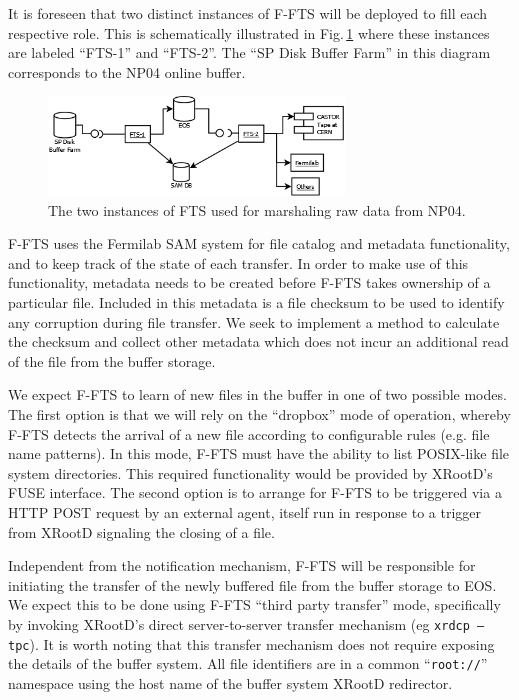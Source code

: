 \documentclass[pdftex,12pt,letter]{article}
\newcommand{\xrd}{XRootD\xspace}
\begin{document}
\noindent It is foreseen that two distinct instances of F-FTS will be deployed to fill each
respective role. This is schematically illustrated in Fig.\,\ref{fig:ftsinstances} where these instances are labeled ``FTS-1'' and ``FTS-2''.
The ``SP Disk Buffer Farm'' in this diagram corresponds to the NP04 online buffer.

\begin{figure}[tbh]
  \centering
  \includegraphics[width=0.7\textwidth]{figures/ftsinstances_v2.png}
  \caption{The two instances of FTS used for marshaling raw data from NP04.}
  \label{fig:ftsinstances}
\end{figure}

F-FTS uses the Fermilab SAM system for file catalog and metadata functionality,
and to keep track of the state of each transfer. In order to make use of this functionality, metadata
needs to be created before F-FTS takes ownership of a particular file. 
Included in this metadata is a file checksum to be used to identify any corruption during file transfer.
We seek to implement a method to calculate the checksum and collect other metadata which does 
not incur an additional read of the file from the buffer storage.

We expect F-FTS to learn of new files in the buffer in one of two
possible modes.  
%
The first option is that we will rely on the ``dropbox'' mode of
operation, whereby F-FTS detects the arrival of a new file according
to configurable rules (e.g. file name patterns). In this mode, F-FTS
must have the ability to list POSIX-like file system directories.
This required functionality would be provided by \xrd's FUSE
interface.
%
The second option is to arrange for F-FTS to be triggered via a HTTP
POST request by an external agent, itself run in response to a trigger
from \xrd signaling the closing of a file.

Independent from the notification mechanism, F-FTS will be responsible
for initiating the transfer of the newly buffered file from the buffer
storage to EOS.  We expect this to be done using F-FTS ``third party
transfer'' mode, specifically by invoking \xrd's direct
server-to-server transfer mechanism (eg \texttt{xrdcp --tpc}).  It is
worth noting that this transfer mechanism does not require exposing
the details of the buffer system.  All file identifiers are in a
common ``\texttt{root://}'' namespace using the host name of the
buffer system \xrd redirector.
\end{document}
